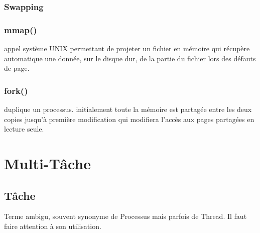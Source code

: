 \documentclass{article}
\begin{document}
\subsubsection{Swapping}

\subsubsection{mmap()}
\begin{definition}
    appel système UNIX permettant de projeter un fichier en mémoire qui récupère automatique une donnée, sur le disque dur, de la partie du fichier lors des défauts de page.
\end{definition}

\subsubsection{fork()}
\begin{definition}
    duplique un processus. initialement toute la mémoire est partagée entre les deux copies jusqu'à première modification qui modifiera l'accès aux pages partagées en lecture seule.
\end{definition}



\section{Multi-Tâche}


\subsection{Tâche}
\begin{definition}\label{def:tache}
    Terme ambigu, souvent synonyme de Processus mais parfois de Thread. Il faut faire attention à son utilisation.
\end{definition}
\end{document}
